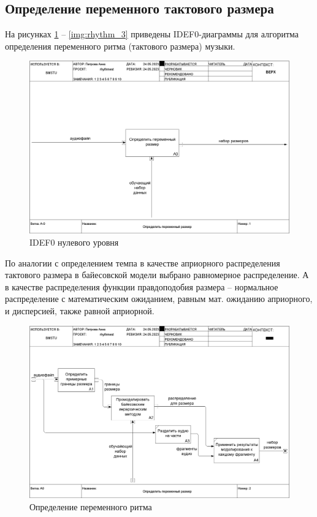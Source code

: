\clearpage

\subsection{Определение переменного тактового размера}

На рисунках \ref{img:rhythm_0} -- \ref{img:rhythm_3} приведены IDEF0-диаграммы для алгоритма определения переменного ритма (тактового размера) музыки.

\begin{figure}[h]
	\centering
	\includegraphics[scale=0.25]{inc/img/rhythm_idef/01_A-0.png}
	\caption{IDEF0 нулевого уровня}
	\label{img:rhythm_0}
\end{figure}

По аналогии с определением темпа в качестве априорного распределения тактового размера в байесовской модели выбрано равномерное распределение. А в качестве распределения функции правдоподобия размера -- нормальное распределение с математическим ожиданием, равным мат. ожиданию априорного, и дисперсией, также равной априорной.

\begin{figure}[h]
	\centering
	\includegraphics[scale=0.25]{inc/img/rhythm_idef/02_A0.png}
	\caption{Определение переменного ритма}
	\label{img:rhythm_1}
\end{figure}


